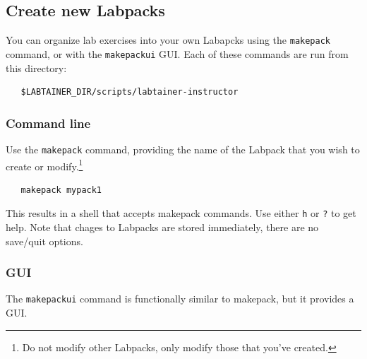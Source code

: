 \documentclass[12pt]{article}
\begin{document}
\subsection{Create new Labpacks}
You can organize lab exercises into your own Labapcks using the {\tt makepack} command, or with the {\tt makepackui} GUI.  
Each of these commands are run from this directory:
\begin{verbatim}
   $LABTAINER_DIR/scripts/labtainer-instructor
\end{verbatim}
\subsubsection{Command line}
Use the {\tt makepack} command, providing the name of the Labpack that you wish
to create or modify.\footnote{Do not modify other Labpacks, only modify those that you've created.}  
\begin{verbatim}
   makepack mypack1
\end{verbatim}

\noindent This results in a shell that accepts makepack commands.  Use either {\tt h} or {\tt ?} to get help.  
Note that chages to Labpacks are stored immediately, there are no save/quit options.

\subsubsection{GUI}
The {\tt makepackui} command is functionally similar to makepack, but it provides a GUI.
\end{document}
